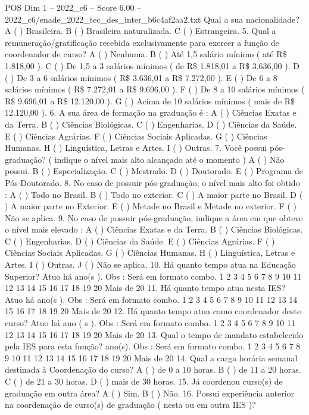 \begin{textsample}{POS Dim 1 – 2022\_c6 – Score 6.00 – 2022\_c6/enade\_2022\_tec\_des\_inter\_b6c4af2aa2.txt}
Qual a sua nacionalidade?
A ( ) Brasileira.
B ( ) Brasileira naturalizada.
C ( ) Estrangeira. 5.
Qual a remuneração/gratificação recebida exclusivamente para exercer a função de coordenador de curso?
A ( ) Nenhuma.
B ( ) Até 1,5 salário mínimo ( até R\$ 1.818,00 ).
C ( ) De 1,5 a 3 salários mínimos ( de R\$ 1.818,01 a R\$ 3.636,00 ).
D ( ) De 3 a 6 salários mínimos ( R\$ 3.636,01 a R\$ 7.272,00 ).
E ( ) De 6 a 8 salários mínimos ( R\$ 7.272,01 a R\$ 9.696,00 ).
F ( ) De 8 a 10 salários mínimos ( R\$ 9.696,01 a R\$ 12.120,00 ).
G ( ) Acima de 10 salários mínimos ( mais de R\$ 12.120,00 ). 6.
A sua área de formação na graduação é : A ( ) Ciências Exatas e da Terra.
B ( ) Ciências Biológicas.
C ( ) Engenharias.
D ( ) Ciências da Saúde.
E ( ) Ciências Agrárias.
F ( ) Ciências Sociais Aplicadas.
G ( ) Ciências Humanas.
H ( ) Linguística, Letras e Artes.
I ( ) Outras. 7.
Você possui pós-graduação? ( indique o nível mais alto alcançado até o momento ) A ( ) Não possui.
B ( ) Especialização.
C ( ) Mestrado.
D ( ) Doutorado.
E ( ) Programa de Pós-Doutorado. 8.
No caso de possuir pós-graduação, o nível mais alto foi obtido : A ( ) Todo no Brasil.
B ( ) Todo no exterior.
C ( ) A maior parte no Brasil.
D ( ) A maior parte no Exterior.
E ( ) Metade no Brasil e Metade no exterior.
F ( ) Não se aplica. 9.
No caso de possuir pós-graduação, indique a área em que obteve o nível mais elevado : A ( ) Ciências Exatas e da Terra.
B ( ) Ciências Biológicas.
C ( ) Engenharias.
D ( ) Ciências da Saúde.
E ( ) Ciências Agrárias.
F ( ) Ciências Sociais Aplicadas.
G ( ) Ciências Humanas.
H ( ) Linguística, Letras e Artes.
I ( ) Outras.
J ( ) Não se aplica. 10.
Há quanto tempo atua na Educação Superior?
Atuo há ano(s ).
Obs : Será em formato combo. 1 2 3 4 5 6 7 8 9 10 11 12 13 14 15 16 17 18 19 20 Mais de 20 11.
Há quanto tempo atua nesta IES?
Atuo há ano(s ).
Obs : Será em formato combo. 1 2 3 4 5 6 7 8 9 10 11 12 13 14 15 16 17 18 19 20 Mais de 20 12.
Há quanto tempo atua como coordenador deste curso?
Atuo há ano ( s ).
Obs : Será em formato combo. 1 2 3 4 5 6 7 8 9 10 11 12 13 14 15 16 17 18 19 20 Mais de 20 13.
Qual o tempo de mandato estabelecido pela IES para esta função? ano(s).
Obs : Será em formato combo. 1 2 3 4 5 6 7 8 9 10 11 12 13 14 15 16 17 18 19 20 Mais de 20 14.
Qual a carga horária semanal destinada à Coordenação do curso?
A ( ) de 0 a 10 horas.
B ( ) de 11 a 20 horas.
C ( ) de 21 a 30 horas.
D ( ) mais de 30 horas. 15.
Já coordenou curso(s) de graduação em outra área?
A ( ) Sim.
B ( ) Não. 16.
Possui experiência anterior na coordenação de curso(s) de graduação ( nesta ou em outra IES )?

\end{textsample}
